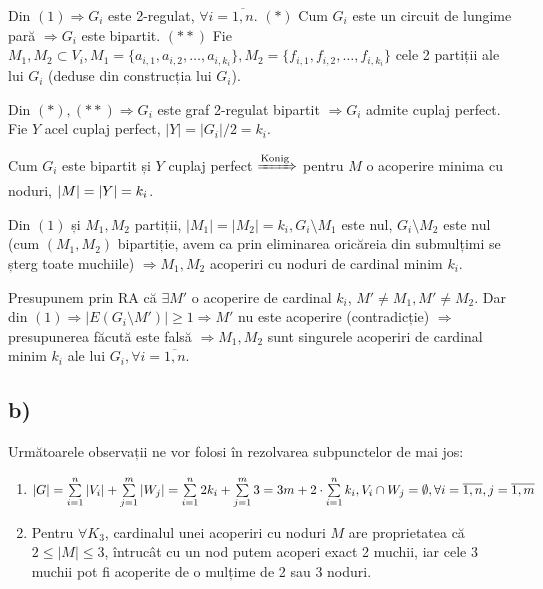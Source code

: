 \documentclass[a4paper,12pt]{article}
\begin{document}
{Din $(1) \Rightarrow G_i$ este 2-regulat, $\forall i = \overline{1, n}$. $(*)$ Cum $G_i$ este un circuit de lungime pară $\Rightarrow G_i$ este bipartit. $(**)$ Fie $M_1, M_2 \subset V_i, M_1 = \{a_{i,1},a_{i,2},\dotsc,a_{i,k_i}\}, M_2 =  \{f_{i,1},f_{i,2},\dotsc,f_{i,k_i}\}$ cele 2 partiții ale lui $G_i$ (deduse din construcția lui $G_i$). 

Din $(*), (**) \Rightarrow G_i$ este graf 2-regulat bipartit $\Rightarrow G_i$ admite cuplaj perfect. Fie $Y$ acel cuplaj perfect, $|Y| = |G_i| / 2 = k_i$.

Cum $G_i$ este bipartit și $Y$ cuplaj perfect $\xRightarrow{\text{Konig}}$ pentru $M$ o acoperire minima cu noduri, $\linebreak|M| = |Y| = k_i$. 

Din $(1)$ și $M_1, M_2$ partiții, $|M_1| = |M_2| = k_i, G_i \setminus M_1$ este nul, $G_i \setminus M_2$ este nul (cum $(M_1, M_2)$ bipartiție, avem ca prin eliminarea oricăreia din  submulțimi se șterg toate muchiile) $\Rightarrow M_1, M_2$ acoperiri cu noduri de cardinal minim $k_i$.

Presupunem prin RA că $\exists M'$ o acoperire de cardinal $k_i$, $M' \neq M_1, M' \neq M_2$. Dar din $(1) \Rightarrow |E(G_i \setminus M')| \geq 1 \Rightarrow M'$ nu este acoperire (contradicție) $\Rightarrow$ presupunerea făcută este falsă $\Rightarrow M_1, M_2$ sunt singurele acoperiri de cardinal minim $k_i$ ale lui $G_i, \forall i = \overline{1, n}$.

\subsection{b)}


Următoarele observații ne vor folosi în rezolvarea subpunctelor de mai jos: 
\renewcommand{\theenumi}{\roman{enumi}}
\begin{enumerate}
\item $|G| = \sum\limits_{i=1}^n |V_i| +  \sum\limits_{j=1}^m |W_j| = \sum\limits_{i=1}^n 2k_i +  \sum\limits_{j=1}^m 3 = 3m + 2\cdot \sum\limits_{i=1}^n k_i, V_i \cap W_j = \emptyset, \forall i = \overline{1, n},\linebreak j = \overline{1, m}$

\item Pentru $\forall K_3$, cardinalul unei acoperiri cu noduri $M$ are proprietatea că $2 \leq |M| \leq 3$, întrucât cu un nod putem acoperi exact 2 muchii, iar cele 3 muchii pot fi acoperite de o mulțime de 2 sau 3 noduri.


\end{enumerate}}
\end{document}
